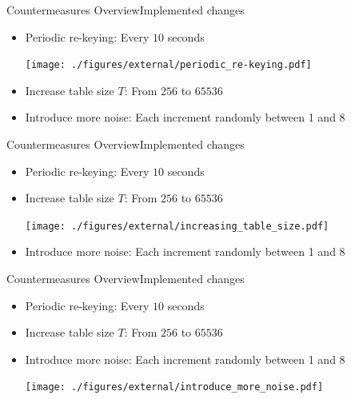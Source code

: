 \documentclass[aspectratio=169, hyperref={colorlinks=true, allcolors=SecondaryColor}, c]{beamer}
\begin{document}
	\begin{frame}[fragile]{Countermeasures Overview}{Implemented changes}
		\begin{itemize}
			\item \alert{Periodic re-keying}: Every $10$ seconds

			\texttt{[image: ./figures/external/periodic\_re-keying.pdf]} %
			\item \alert{Increase table size $T$}: From $256$ to $65536$

			\item \alert{Introduce more noise}: Each increment randomly between 1 and 8

		\end{itemize}
	\end{frame}

	\begin{frame}[fragile]{Countermeasures Overview}{Implemented changes}
		\begin{itemize}
			\item \alert{Periodic re-keying}: Every $10$ seconds

			\item \alert{Increase table size $T$}: From $256$ to $65536$

			\texttt{[image: ./figures/external/increasing\_table\_size.pdf]} %
			\item \alert{Introduce more noise}: Each increment randomly between 1 and 8

		\end{itemize}
	\end{frame}

	\begin{frame}[fragile]{Countermeasures Overview}{Implemented changes}
		\begin{itemize}
			\item \alert{Periodic re-keying}: Every $10$ seconds

			\item \alert{Increase table size $T$}: From $256$ to $65536$

			\item \alert{Introduce more noise}: Each increment randomly between 1 and 8

			\texttt{[image: ./figures/external/introduce\_more\_noise.pdf]} %
		\end{itemize}
	\end{frame}
\end{document}
